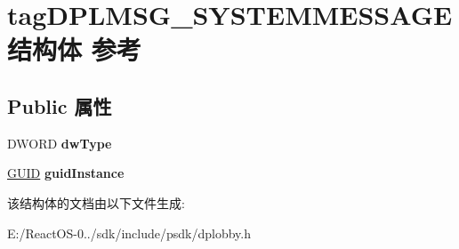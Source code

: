 \hypertarget{structtag_d_p_l_m_s_g___s_y_s_t_e_m_m_e_s_s_a_g_e}{}\section{tag\+D\+P\+L\+M\+S\+G\+\_\+\+S\+Y\+S\+T\+E\+M\+M\+E\+S\+S\+A\+G\+E结构体 参考}
\label{structtag_d_p_l_m_s_g___s_y_s_t_e_m_m_e_s_s_a_g_e}
\subsection*{Public 属性}
\begin{DoxyCompactItemize}
\item 
\mbox{\label{structtag_d_p_l_m_s_g___s_y_s_t_e_m_m_e_s_s_a_g_e_a05d72a361c0b39579a167380461b35c5}} 
D\+W\+O\+RD {\bfseries dw\+Type}
\item 
\mbox{\label{structtag_d_p_l_m_s_g___s_y_s_t_e_m_m_e_s_s_a_g_e_abf2ab8656235bd832a3f02b398e2abc2}} 
\hyperlink{interface_g_u_i_d}{G\+U\+ID} {\bfseries guid\+Instance}
\end{DoxyCompactItemize}


该结构体的文档由以下文件生成\+:\begin{DoxyCompactItemize}
\item 
E\+:/\+React\+O\+S-\/0../sdk/include/psdk/dplobby.\+h\end{DoxyCompactItemize}
